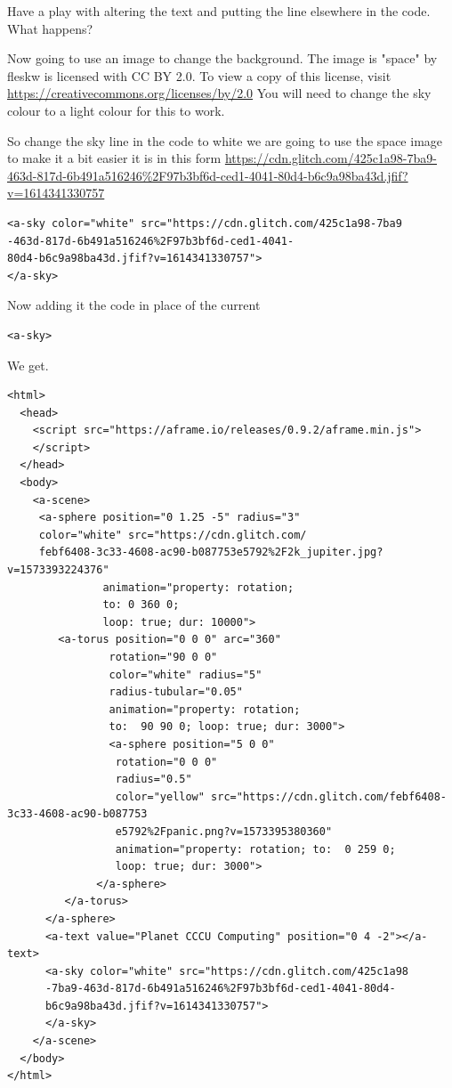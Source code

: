 Have a play with altering the text and putting the line elsewhere in the code. What happens?

Now going to use an image to change the background. The image is "space" by fleskw is licensed with CC BY 2.0. To view a copy of this license, visit \url{https://creativecommons.org/licenses/by/2.0} You will need to change the sky colour to a light colour for this to work. 

So change the sky line in the code to white we are going to use the space image to make it a bit easier it is in this form \url{https://cdn.glitch.com/425c1a98-7ba9-463d-817d-6b491a516246%2F97b3bf6d-ced1-4041-80d4-b6c9a98ba43d.jfif?v=1614341330757} 

\begin{lstlisting}
<a-sky color="white" src="https://cdn.glitch.com/425c1a98-7ba9
-463d-817d-6b491a516246%2F97b3bf6d-ced1-4041-
80d4-b6c9a98ba43d.jfif?v=1614341330757">
</a-sky>
\end{lstlisting}
Now adding it the code in place of the current 
\begin{lstlisting}
<a-sky>\end{lstlisting}

We get.
\begin{lstlisting}
<html>
  <head>
    <script src="https://aframe.io/releases/0.9.2/aframe.min.js">
    </script>
  </head>
  <body>
    <a-scene>
     <a-sphere position="0 1.25 -5" radius="3" 
     color="white" src="https://cdn.glitch.com/
     febf6408-3c33-4608-ac90-b087753e5792%2F2k_jupiter.jpg?v=1573393224376"
               animation="property: rotation; 
               to: 0 360 0; 
               loop: true; dur: 10000">
        <a-torus position="0 0 0" arc="360"
                rotation="90 0 0"
                color="white" radius="5"
                radius-tubular="0.05"
                animation="property: rotation; 
                to:  90 90 0; loop: true; dur: 3000">
                <a-sphere position="5 0 0"
                 rotation="0 0 0"
                 radius="0.5"
                 color="yellow" src="https://cdn.glitch.com/febf6408-3c33-4608-ac90-b087753
                 e5792%2Fpanic.png?v=1573395380360"
                 animation="property: rotation; to:  0 259 0; 
                 loop: true; dur: 3000">
              </a-sphere>
         </a-torus>
      </a-sphere>   
      <a-text value="Planet CCCU Computing" position="0 4 -2"></a-text>
      <a-sky color="white" src="https://cdn.glitch.com/425c1a98
      -7ba9-463d-817d-6b491a516246%2F97b3bf6d-ced1-4041-80d4-
      b6c9a98ba43d.jfif?v=1614341330757">
      </a-sky>
    </a-scene>
  </body>
</html>
\end{lstlisting}

